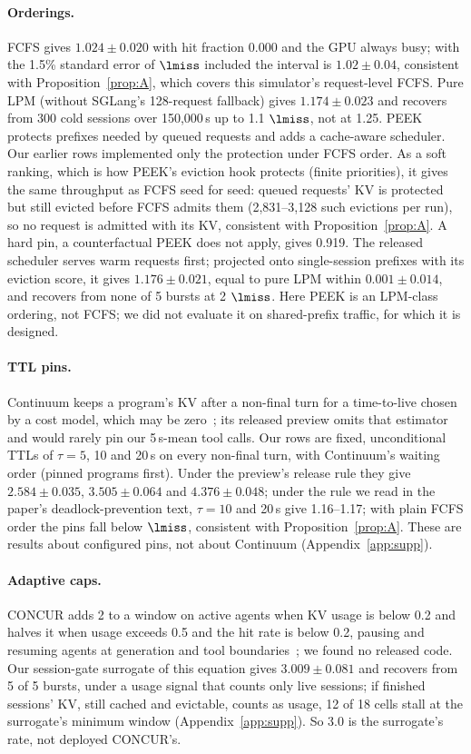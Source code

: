 \paragraph{Orderings.} FCFS gives $1.024\pm0.020$ with hit fraction 0.000 and the GPU always busy; with the 1.5\% standard error of $\lmiss$ included the interval is $1.02\pm0.04$, consistent with Proposition~\ref{prop:A}, which covers this simulator's request-level FCFS. Pure LPM (without SGLang's 128-request fallback) gives $1.174\pm0.023$ and recovers from 300 cold sessions over 150,000\,s up to 1.1 $\lmiss$, not at 1.25. PEEK~\citep{xie2026peek} protects prefixes needed by queued requests and adds a cache-aware scheduler. Our earlier rows implemented only the protection under FCFS order. As a soft ranking, which is how PEEK's eviction hook protects (finite priorities), it gives the same throughput as FCFS seed for seed: queued requests' KV is protected but still evicted before FCFS admits them (2,831--3,128 such evictions per run), so no request is admitted with its KV, consistent with Proposition~\ref{prop:A}. A hard pin, a counterfactual PEEK does not apply, gives 0.919. The released scheduler serves warm requests first; projected onto single-session prefixes with its eviction score, it gives $1.176\pm0.021$, equal to pure LPM within $0.001\pm0.014$, and recovers from none of 5 bursts at 2 $\lmiss$. Here PEEK is an LPM-class ordering, not FCFS; we did not evaluate it on shared-prefix traffic, for which it is designed.

\paragraph{TTL pins.} Continuum keeps a program's KV after a non-final turn for a time-to-live chosen by a cost model, which may be zero~\citep{li2025continuum}; its released preview omits that estimator and would rarely pin our 5\,s-mean tool calls. Our rows are fixed, unconditional TTLs of $\tau=5$, 10 and 20\,s on every non-final turn, with Continuum's waiting order (pinned programs first). Under the preview's release rule they give $2.584\pm0.035$, $3.505\pm0.064$ and $4.376\pm0.048$; under the rule we read in the paper's deadlock-prevention text, $\tau=10$ and 20\,s give 1.16--1.17; with plain FCFS order the pins fall below $\lmiss$, consistent with Proposition~\ref{prop:A}. These are results about configured pins, not about Continuum (Appendix~\ref{app:supp}).

\paragraph{Adaptive caps.} CONCUR adds 2 to a window on active agents when KV usage is below 0.2 and halves it when usage exceeds 0.5 and the hit rate is below 0.2, pausing and resuming agents at generation and tool boundaries~\citep{chen2026concur}; we found no released code. Our session-gate surrogate of this equation gives $3.009\pm0.081$ and recovers from 5 of 5 bursts, under a usage signal that counts only live sessions; if finished sessions' KV, still cached and evictable, counts as usage, 12 of 18 cells stall at the surrogate's minimum window (Appendix~\ref{app:supp}). So 3.0 is the surrogate's rate, not deployed CONCUR's.

